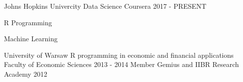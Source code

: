 \begin{cventries}
  \cventry
    {Johns Hopkins Univercity}
    {Data Science}
    {Coursera}
    {2017 - PRESENT}
    {
      \begin{cvitems}
        \item {R Programming}
        \item {Machine Learning}
      \end{cvitems}
    }
  \cventry
    {University of Warsaw}
    {R programming in economic and financial applications}
    {Faculty of Economic Sciences}
    {2013 - 2014}
    {}
  \cventry
    {Member}
    {Gemius and IIBR Research Academy}
    {}
    {2012}
    {}
\end{cventries}
